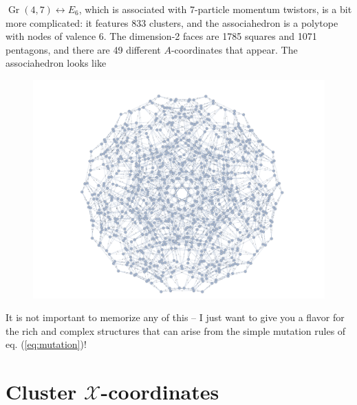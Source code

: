 \documentclass[11pt]{article}
\DeclareMathOperator{\Gr}{Gr}
\def\x{\mathcal{X}}
\begin{document}
$\Gr(4,7) \leftrightarrow E_6$, which is associated with 7-particle momentum twistors, is a bit more complicated: it features 833 clusters, and the associahedron is a polytope with nodes of valence 6. The dimension-2 faces are 1785 squares and 1071 pentagons, and there are 49 different $A$-coordinates that appear. The associahedron looks like
\begin{figure}[h]
  \centering
  \includegraphics[scale=0.25]{e6-associahedron}
\end{figure}


\noindent It is not important to memorize any of this -- I just want to give you a flavor for the rich and complex structures that can arise from the simple mutation rules of eq. (\ref{eq:mutation})!

\section{Cluster \texorpdfstring{$\x$}{X}-coordinates}
\end{document}
